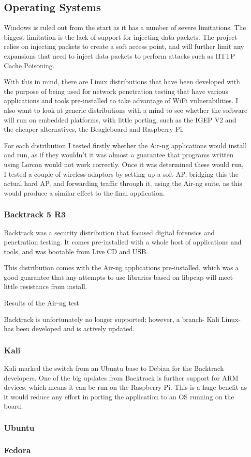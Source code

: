 \subsection{Operating Systems}
Windows is ruled out from the start as it has a number of severe limitations. The biggest limitation is the lack of support for injecting data packets. The project relies on injecting packets to create a soft access point, and will further limit any expansions that need to inject data packets to perform attacks such as HTTP Cache Poisoning.

With this in mind, there are Linux distributions that have been developed with the purpose of being used for network penetration testing that have various applications and tools pre-installed to take advantage of WiFi vulnerabilities. I also want to look at generic distributions with a mind to see whether the software will run on embedded platforms, with little porting, such as the IGEP V2 and the cheaper alternatives, the Beagleboard and Raspberry Pi.

For each distribution I tested firstly whether the Air-ng applications would install and run, as if they wouldn’t it was almost a guarantee that programs written using Lorcon would not work correctly. Once it was determined these would run, I tested a couple of wireless adaptors by setting up a soft AP, bridging this the actual hard AP, and forwarding traffic through it, using the Air-ng suite, as this would produce a similar effect to the final application.
\subsubsection{Backtrack 5 R3}
Backtrack was a security distribution that focused digital forensics and penetration testing. It comes pre-installed with a whole host of applications and tools, and was bootable from Live CD and USB. 

This distribution comes with the Air-ng applications pre-installed, which was a good guarantee that any attempts to use libraries based on libpcap will meet little resistance from install.

Results of the Air-ng test

Backtrack is unfortunately no longer supported; however, a branch- Kali Linux- has been developed and is actively updated.
\subsubsection{Kali}
Kali marked the switch from an Ubuntu base to Debian for the Backtrack developers. One of the big updates from Backtrack is further support for ARM devices, which means it can be run on the Raspberry Pi. This is a huge benefit as it would reduce any effort in porting the application to an OS running on the board.
\subsubsection{Ubuntu}

\subsubsection{Fedora}